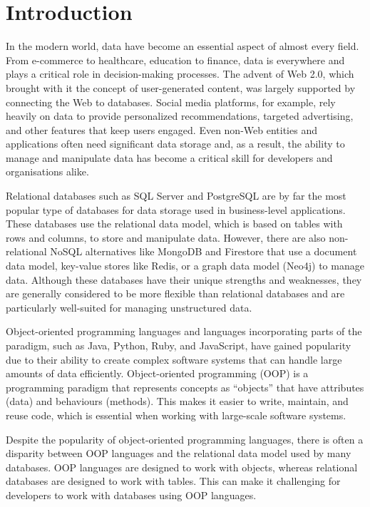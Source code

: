 \chapter{Introduction}

In the modern world, data have become an essential aspect of almost every field.
From e-commerce to healthcare, education to finance, data is everywhere and
plays a critical role in decision-making processes. The advent of Web
2.0\cite{Web2Oreilly}, which brought with it the concept of user-generated
content, was largely supported by connecting the Web to databases. Social media
platforms, for example, rely heavily on data to provide personalized
recommendations, targeted advertising, and other features that keep users
engaged. Even non-Web entities and applications often need significant data
storage and, as a result, the ability to manage and manipulate data has become a
critical skill for developers and organisations alike.

Relational databases such as SQL Server and PostgreSQL are by far the most
popular type of databases for data storage used in business-level applications.
These databases use the relational data model, which is based on tables with
rows and columns, to store and manipulate data. However, there are also
non-relational NoSQL alternatives like MongoDB and Firestore that use a document
data model, key-value stores like Redis, or a graph data model (Neo4j) to manage
data. Although these databases have their unique strengths and weaknesses, they
are generally considered to be more flexible than relational databases and are
particularly well-suited for managing unstructured data.

Object-oriented programming languages and languages incorporating parts of the
paradigm, such as Java, Python, Ruby, and JavaScript, have gained
popularity\cite{stack-overflow-survey} due to their ability to create complex
software systems that can handle large amounts of data efficiently.
Object-oriented programming (OOP) is a programming paradigm that represents
concepts as \enquote{objects} that have attributes (data) and behaviours
(methods). This makes it easier to write, maintain, and reuse code, which is
essential when working with large-scale software systems.

Despite the popularity of object-oriented programming languages, there is often
a disparity between OOP languages and the relational data model used by many
databases. OOP languages are designed to work with objects, whereas relational
databases are designed to work with tables. This can make it challenging for
developers to work with databases using OOP languages. 

